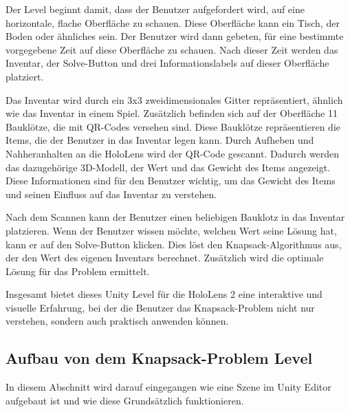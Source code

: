 Der Level beginnt damit, dass der Benutzer aufgefordert wird, auf eine
horizontale, flache Oberfläche zu schauen. Diese Oberfläche kann ein Tisch,
der Boden oder ähnliches sein. Der Benutzer wird dann gebeten, für eine bestimmte
vorgegebene Zeit auf diese Oberfläche zu schauen. Nach dieser Zeit werden das Inventar,
der Solve-Button und drei Informationslabels auf dieser Oberfläche platziert.

Das Inventar wird durch ein 3x3 zweidimensionales Gitter repräsentiert, ähnlich
wie das Inventar in einem Spiel. Zusätzlich befinden sich auf der Oberfläche 11 Bauklötze,
die mit QR-Codes versehen sind. Diese Bauklötze repräsentieren die Items, die der Benutzer
in das Inventar legen kann. Durch Aufheben und Nahheranhalten an die HoloLens wird der QR-Code gescannt.
Dadurch werden das dazugehörige 3D-Modell, der Wert und das Gewicht des Items angezeigt.
Diese Informationen sind für den Benutzer wichtig, um das Gewicht des Items und
seinen Einfluss auf das Inventar zu verstehen.

Nach dem Scannen kann der Benutzer einen beliebigen Bauklotz in das Inventar platzieren.
Wenn der Benutzer wissen möchte, welchen Wert seine Lösung hat, kann er auf den Solve-Button
klicken. Dies löst den Knapsack-Algorithmus aus, der den Wert des eigenen Inventars berechnet.
Zusätzlich wird die optimale Lösung für das Problem ermittelt.

Insgesamt bietet dieses Unity Level für die HoloLens 2 eine interaktive und visuelle Erfahrung,
bei der die Benutzer das Knapsack-Problem nicht nur verstehen, sondern auch praktisch anwenden können.

\subsection{Aufbau von dem Knapsack-Problem Level}
In diesem Abschnitt wird darauf eingegangen wie eine Szene im Unity Editor aufgebaut ist und wie diese
Grundsätzlich funktionieren. \\

